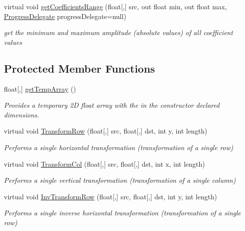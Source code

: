\begin{DoxyCompactItemize}
virtual void \hyperlink{class_turbo_wavelets_1_1_wavelet2_d_ad25227565f3b5e5953e951ad5b375654}{get\-Coefficients\-Range} (float\mbox{[},\mbox{]} src, out float min, out float max, \hyperlink{class_turbo_wavelets_1_1_wavelet2_d_aec52fe74aa08e073119064ef4ac3fe93}{\-Progress\-Delegate} progress\-Delegate=null)
\begin{DoxyCompactList}\small\item\em get the minimum and maximum amplitude (absolute values) of all coefficient values \end{DoxyCompactList}\end{DoxyCompactItemize}
\subsection*{\-Protected \-Member \-Functions}
\begin{DoxyCompactItemize}
\item 
float\mbox{[},\mbox{]} \hyperlink{class_turbo_wavelets_1_1_wavelet2_d_a3dc6269869eb9c864f615e42d7822153}{get\-Temp\-Array} ()
\begin{DoxyCompactList}\small\item\em \-Provides a temporary 2\-D float array with the in the constructor declared dimensions. \end{DoxyCompactList}\item 
virtual void \hyperlink{class_turbo_wavelets_1_1_wavelet2_d_af0339475762d327f9d8ec019079cdc28}{\-Transform\-Row} (float\mbox{[},\mbox{]} src, float\mbox{[},\mbox{]} dst, int y, int length)
\begin{DoxyCompactList}\small\item\em \-Performs a single horizontal transformation (transformation of a single row) \end{DoxyCompactList}\item 
virtual void \hyperlink{class_turbo_wavelets_1_1_wavelet2_d_a6a6c334fb499d248b72215001ff5e9d4}{\-Transform\-Col} (float\mbox{[},\mbox{]} src, float\mbox{[},\mbox{]} dst, int x, int length)
\begin{DoxyCompactList}\small\item\em \-Performs a single vertical transformation (transformation of a single column) \end{DoxyCompactList}\item 
virtual void \hyperlink{class_turbo_wavelets_1_1_wavelet2_d_ac0b65a648f05436b54aa4d925812e1d5}{\-Inv\-Transform\-Row} (float\mbox{[},\mbox{]} src, float\mbox{[},\mbox{]} dst, int y, int length)
\begin{DoxyCompactList}\small\item\em \-Performs a single inverse horizontal transformation (transformation of a single row) \end{DoxyCompactList}\item 

\end{DoxyCompactItemize}
